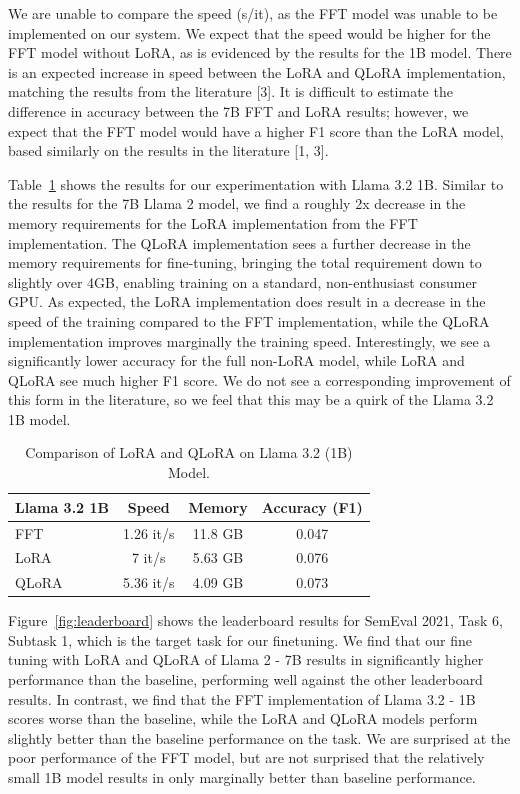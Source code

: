 \documentclass[11pt]{article}
\begin{document}
We are unable to compare the speed (s/it), as the FFT model was unable to be implemented on our system. We expect that the speed would be higher for the FFT model without LoRA, as is evidenced by the results for the 1B model. There is an expected increase in speed between the LoRA and QLoRA implementation, matching the results from the literature [3]. It is difficult to estimate the difference in accuracy between the 7B FFT and LoRA results; however, we expect that the FFT model would have a higher F1 score than the LoRA model, based similarly on the results in the literature [1, 3].


Table~\ref*{tab:lora_qlora_3_2} shows the results for our experimentation with Llama 3.2 1B. Similar to the results for the 7B Llama 2 model, we find a roughly 2x decrease in the memory requirements for the LoRA implementation from the FFT implementation. The QLoRA implementation sees a further decrease in the memory requirements for fine-tuning, bringing the total requirement down to slightly over 4GB, enabling training on a standard, non-enthusiast consumer GPU. As expected, the LoRA implementation does result in a decrease in the speed of the training compared to the FFT implementation, while the QLoRA implementation improves marginally the training speed. Interestingly, we see a significantly lower accuracy for the full non-LoRA model, while LoRA and QLoRA see much higher F1 score. We do not see a corresponding improvement of this form in the literature, so we feel that this may be a quirk of the Llama 3.2 1B model.

\begin{table}[h]
	\centering
	\caption{Comparison of LoRA and QLoRA on Llama 3.2 (1B) Model.}
	\label{tab:lora_qlora_3_2}
	\begin{tabular}{|l|c|c|c|}
		\hline
		\textbf{Llama 3.2 1B} & \textbf{Speed} & \textbf{Memory} & \textbf{Accuracy (F1)} \\ \hline
		FFT   & 1.26 it/s & 11.8 GB & 0.047 \\ \hline
		LoRA  & 7 it/s    & 5.63 GB & 0.076 \\ \hline
		QLoRA & 5.36 it/s & 4.09 GB & 0.073 \\ \hline
	\end{tabular}
\end{table}


Figure~\ref{fig:leaderboard} shows the leaderboard results for SemEval 2021, Task 6, Subtask 1, which is the target task for our finetuning. We find that our fine tuning with LoRA and QLoRA of Llama 2 - 7B results in significantly higher performance than the baseline, performing well against the other leaderboard results. In contrast, we find that the FFT implementation of Llama 3.2 - 1B scores worse than the baseline, while the LoRA and QLoRA models perform slightly better than the baseline performance on the task. We are surprised at the poor performance of the FFT model, but are not surprised that the relatively small 1B model results in only marginally better than baseline performance.
\end{document}
